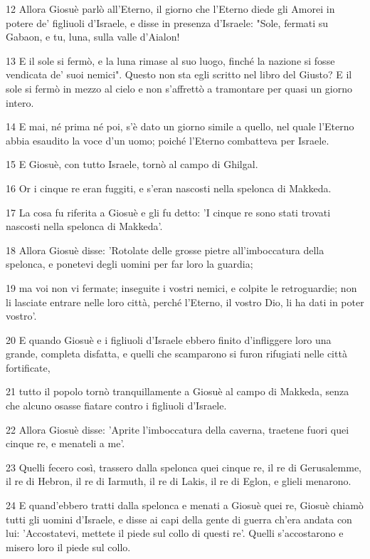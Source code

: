 \par 12 Allora Giosuè parlò all'Eterno, il giorno che l'Eterno diede gli Amorei in potere de' figliuoli d'Israele, e disse in presenza d'Israele: "Sole, fermati su Gabaon, e tu, luna, sulla valle d'Aialon!
\par 13 E il sole si fermò, e la luna rimase al suo luogo, finché la nazione si fosse vendicata de' suoi nemici". Questo non sta egli scritto nel libro del Giusto? E il sole si fermò in mezzo al cielo e non s'affrettò a tramontare per quasi un giorno intero.
\par 14 E mai, né prima né poi, s'è dato un giorno simile a quello, nel quale l'Eterno abbia esaudito la voce d'un uomo; poiché l'Eterno combatteva per Israele.
\par 15 E Giosuè, con tutto Israele, tornò al campo di Ghilgal.
\par 16 Or i cinque re eran fuggiti, e s'eran nascosti nella spelonca di Makkeda.
\par 17 La cosa fu riferita a Giosuè e gli fu detto: 'I cinque re sono stati trovati nascosti nella spelonca di Makkeda'.
\par 18 Allora Giosuè disse: 'Rotolate delle grosse pietre all'imboccatura della spelonca, e ponetevi degli uomini per far loro la guardia;
\par 19 ma voi non vi fermate; inseguite i vostri nemici, e colpite le retroguardie; non li lasciate entrare nelle loro città, perché l'Eterno, il vostro Dio, li ha dati in poter vostro'.
\par 20 E quando Giosuè e i figliuoli d'Israele ebbero finito d'infliggere loro una grande, completa disfatta, e quelli che scamparono si furon rifugiati nelle città fortificate,
\par 21 tutto il popolo tornò tranquillamente a Giosuè al campo di Makkeda, senza che alcuno osasse fiatare contro i figliuoli d'Israele.
\par 22 Allora Giosuè disse: 'Aprite l'imboccatura della caverna, traetene fuori quei cinque re, e menateli a me'.
\par 23 Quelli fecero così, trassero dalla spelonca quei cinque re, il re di Gerusalemme, il re di Hebron, il re di Iarmuth, il re di Lakis, il re di Eglon, e glieli menarono.
\par 24 E quand'ebbero tratti dalla spelonca e menati a Giosuè quei re, Giosuè chiamò tutti gli uomini d'Israele, e disse ai capi della gente di guerra ch'era andata con lui: 'Accostatevi, mettete il piede sul collo di questi re'. Quelli s'accostarono e misero loro il piede sul collo.
